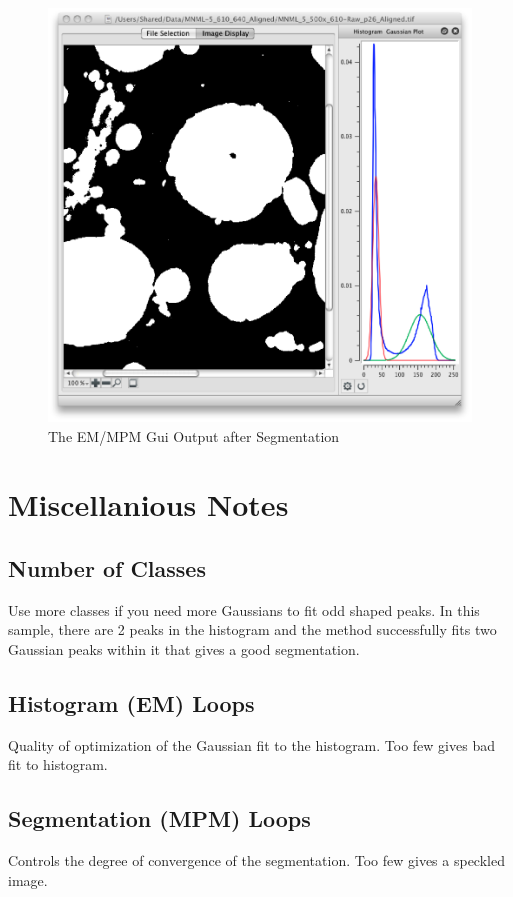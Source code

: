 \documentclass[12pt,oneside]{book}
\begin{document}
 
\begin{figure}[htbp]
\begin{center}
\includegraphics[width=6.0in]{images/Untitled6.png}
\caption{The EM/MPM Gui Output after Segmentation}
\label{image6}
\end{center}
\end{figure}



\chapter{Miscellanious Notes}
\section{Number of Classes}
Use more classes if you need more Gaussians to fit odd shaped peaks. In this sample, there are 2 peaks in the histogram and the method successfully fits two Gaussian peaks within it that gives a good segmentation.
\section{Histogram (EM) Loops}
Quality of optimization of the Gaussian fit to the histogram. Too few gives bad fit to histogram.
\section{Segmentation (MPM) Loops}
Controls the degree of convergence of the segmentation. Too few gives a speckled image.
\end{document}
